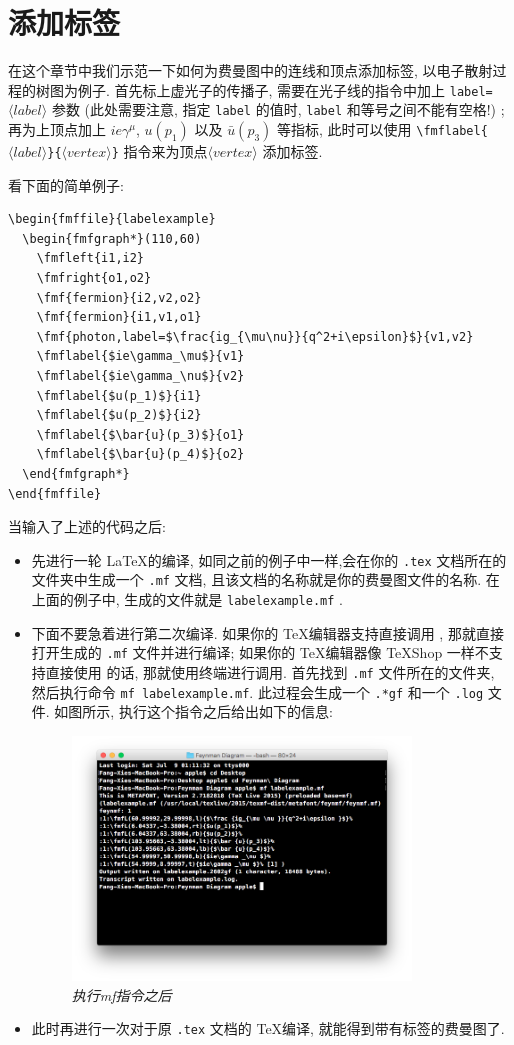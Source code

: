 \documentclass{article}
\begin{document}
\section{添加标签}
在这个章节中我们示范一下如何为费曼图中的连线和顶点添加标签, 以电子散射过程的树图为例子. 首先标上虚光子的传播子, 需要在光子线的指令中加上 \verb+label=+$\langle label\rangle$ 参数 (此处需要注意, 指定 \verb+label+ 的值时, \verb+label+ 和等号之间不能有空格!) ;再为上顶点加上 $ie\gamma^\mu$, $u(p_1)$ 以及 $\bar{u}(p_3)$ 等指标, 此时可以使用 \verb+\fmflabel{+$\langle label \rangle$\verb+}{+$\langle vertex\rangle$\verb+}+ 指令来为顶点$\langle vertex \rangle$ 添加标签.

看下面的简单例子:
\begin{verbatim}
\begin{fmffile}{labelexample}
  \begin{fmfgraph*}(110,60)
    \fmfleft{i1,i2}
    \fmfright{o1,o2}
    \fmf{fermion}{i2,v2,o2}
    \fmf{fermion}{i1,v1,o1}
    \fmf{photon,label=$\frac{ig_{\mu\nu}}{q^2+i\epsilon}$}{v1,v2}
    \fmflabel{$ie\gamma_\mu$}{v1}
    \fmflabel{$ie\gamma_\nu$}{v2}
    \fmflabel{$u(p_1)$}{i1}
    \fmflabel{$u(p_2)$}{i2}
    \fmflabel{$\bar{u}(p_3)$}{o1}
    \fmflabel{$\bar{u}(p_4)$}{o2}
  \end{fmfgraph*}
\end{fmffile}
\end{verbatim}
当输入了上述的代码之后: 
\begin{itemize}
\item 先进行一轮 \LaTeX 的编译, 如同之前的例子中一样,会在你的 \verb+.tex+ 文档所在的文件夹中生成一个 \verb+.mf+ 文档, 且该文档的名称就是你的费曼图文件的名称. 在上面的例子中, 生成的文件就是 \verb+labelexample.mf+ . 
\item 下面不要急着进行第二次编译. 如果你的 \TeX 编辑器支持直接调用 \MF, 那就直接打开生成的 \verb+.mf+ 文件并进行编译; 如果你的 \TeX 编辑器像 TeXShop 一样不支持直接使用 \MF 的话, 那就使用终端进行调用. 首先找到 \verb+.mf+ 文件所在的文件夹, 然后执行命令 \verb+mf labelexample.mf+. 此过程会生成一个 \verb+.*gf+ 和一个 \verb+.log+ 文件. 如图所示, 执行这个指令之后给出如下的信息:
\begin{figure}[!htp]
\centering
\includegraphics[width=9cm]{labelter1.png}
\caption{\emph{执行mf指令之后}}
\end{figure}
\item 此时再进行一次对于原 \verb+.tex+ 文档的 \TeX 编译, 就能得到带有标签的费曼图了.

\end{itemize}
\end{document}

